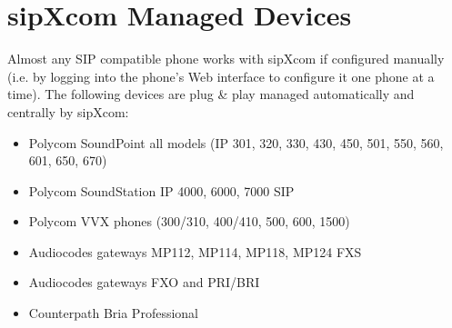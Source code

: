 \documentclass[letterpaper,10pt,english]{sphinxmanual}
\begin{document}
\section{sipXcom Managed Devices}
\label{\detokenize{features:sipxcom-managed-devices}}
Almost any SIP compatible phone works with sipXcom if configured manually (i.e. by logging into the phone’s Web interface to configure it one phone at a time). The following devices are plug \& play managed automatically and centrally by sipXcom:
\begin{itemize}
\item {} 
Polycom SoundPoint all models (IP 301, 320, 330, 430, 450, 501, 550, 560, 601, 650, 670)

\item {} 
Polycom SoundStation IP 4000, 6000, 7000 SIP

\item {} 
Polycom VVX phones (300/310, 400/410, 500, 600, 1500)

\item {} 
Audiocodes gateways MP112, MP114, MP118, MP124 FXS

\item {} 
Audiocodes gateways FXO and PRI/BRI

\item {} 
Counterpath Bria Professional

\end{itemize}
\end{document}
